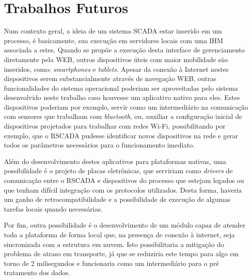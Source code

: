 \section{Trabalhos Futuros}
\label{sec:trabalhos-futuros}

Num contexto geral, a ideia de um sistema \gls{SCADA} estar inserido em um processo, é basicamente, sua execução em servidores locais com uma \gls{IHM} associada a estes. Quando se propõe a execução desta interface de gerenciamento diretamente pela \gls{WEB}, outros dispositivos úteis com maior mobilidade são inseridos, como: \textit{smartphones} e \textit{tablets}. Apesar da conexão à Internet nestes dispositivos serem substancialmente através de navegação \gls{WEB}, outras funcionalidades do sistema operacional poderiam ser aproveitadas pelo sistema desenvolvido neste trabalho caso houvesse um aplicativo nativo para eles. Estes dispositivos poderiam por exemplo, servir como um intermediário na comunicação com sensores que trabalham com \textit{bluetooth}, ou, auxiliar a configuração inicial de dispositivos projetados para trabalhar com redes Wi-Fi, possibilitando por exemplo, que o RSCADA pudesse identificar novos dispositivos na rede e gerar todos os parâmetros necessários para o funcionamento imediato.

Além do desenvolvimento destes aplicativos para plataformas nativas, uma possibilidade é o projeto de placas eletrônicas, que serviriam como \textit{drivers} de comunicação entre o RSCADA e dispositivos do processo que estejam legados ou que tenham difícil integração com os protocolos utilizados. Desta forma, haveria um ganho de retrocompatibilidade e a possibilidade de execução de algumas tarefas locais quando necessárias.

Por fim, outra possibilidade é o desenvolvimento de um módulo capaz de atender toda a plataforma de forma local que, na presença de conexão à internet, seja sincronizada com a estrutura em nuvem. Isto possibilitaria a mitigação do problema de atraso em transporte, já que se reduziria este tempo para algo em torno de 2 milisegundos e funcionaria como um intermediário para o pré tratamento dos dados.